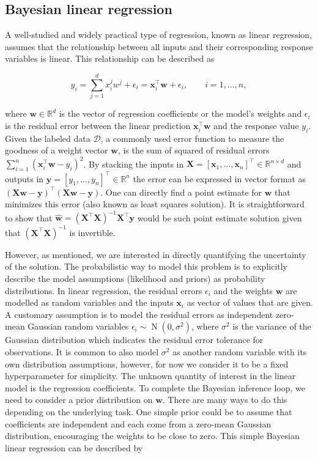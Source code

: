 \documentclass[dissertation,math,vertlayout,pdfa,colorlinks]{aaltoseries}
\newcommand{\bw}{\bm{w}}
\newcommand{\bX}{\bm{X}}
\newcommand{\by}{\bm{y}}
\newcommand{\bD}{\mathcal{D}}
\DeclareMathOperator{\normalpdf}{N}
\newcommand{\tp}{^{\top}}
\begin{document}
\subsection{Bayesian linear regression}

A well-studied and widely practical type of regression, known as linear regression, assumes that the relationship between all inputs and their corresponding response variables is linear. This relationship can be described as 

\begin{equation}\label{Eq:linear_reg_no_Bayes}
y_i= \sum_{j=1}^{d}x_{i}^{j} w^{j}+\epsilon_i=\bm{x}_i\tp\bw+\epsilon_i, \qquad i=1,\ldots,n,
\end{equation}

\noindent where $\bw \in \mathbb{R}^d$ is the vector of regression coefficients or the model's weights and $\epsilon_i$ is the residual error between the linear prediction $\bm{x}_i\tp\bw$ and the response value $y_i$. Given the labeled data $\bD$, a commonly used error function to measure the goodness of a  weight vector $\bw$, is the sum of squared of residual errors $\sum_{i=1}^n(\bm{x}_i\tp\bw- y_i)^2$. By stacking the inputs in $\bX = [\bm{x}_1,\ldots,\bm{x}_n]\tp \in \mathbb{R}^{n\times d}$ and outputs in $\by = [y_1,\ldots,y_n]\tp \in \mathbb{R}^n$ the error can be expressed in vector format as $(\bX\bw- \by)\tp(\bX\bw- \by)$. 
One can directly find a point estimate for $\bw$ that minimizes this error (also known as least squares solution). 
It is straightforward to show that $\hat{\bw} = (\bX \tp \bX)^{-1}\bX\tp \by$  would be such point estimate solution given that $(\bX \tp \bX)^{-1}$ is invertible.  

However, as mentioned, we are interested in directly quantifying the uncertainty of the solution. The probabilistic way to model this problem is to explicitly describe the model assumptions (likelihood and priors) as probability distributions. In linear regression, the residual errors $\epsilon_i$ and the weights $\bw$ are modelled as random variables and the inputs $\bm{x}_i$ as vector of values that are given. A customary assumption is to model the residual errors as independent zero-mean Gaussian random variables $\epsilon_i \sim \normalpdf(0,\sigma^2)$, where $\sigma^2$ is the variance of the Gaussian distribution which indicates the residual error tolerance for observations. It is common to also model $\sigma^2$ as another random variable with its own distribution assumptions, however, for now we consider it to be a fixed hyperparameter for simplicity. The unknown quantity of interest in the linear model is the regression coefficients. To complete the Bayesian inference loop, we need to consider a prior distribution on $\bw$. There are many ways to do this depending on the underlying task. One simple prior could be to assume that coefficients are independent and each come from a zero-mean Gaussian distribution, encouraging the weights to be close to zero. This simple Bayesian linear regression can be described by
\end{document}
